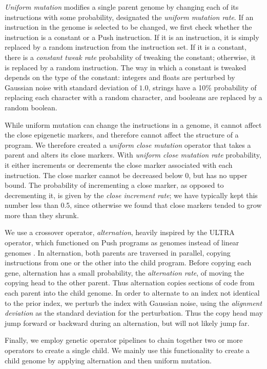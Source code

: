 \documentclass[graybox]{svmult}
\begin{document}
\textit{Uniform mutation} modifies a single parent genome by changing each of its instructions with some probability, designated the \textit{uniform mutation rate}. If an instruction in the genome is selected to be changed, we first check whether the instruction is a constant or a Push instruction. If it is an instruction, it is simply replaced by a random instruction from the instruction set. If it is a constant, there is a \textit{constant tweak rate} probability of tweaking the constant; otherwise, it is replaced by a random instruction. The way in which a constant is tweaked depends on the type of the constant: integers and floats are perturbed by Gaussian noise with standard deviation of $1.0$, strings have a 10\% probability of replacing each character with a random character, and booleans are replaced by a random boolean.

While uniform mutation can change the instructions in a genome, it cannot affect the close epigenetic markers, and therefore cannot affect the structure of a program. We therefore created a \textit{uniform close mutation} operator that takes a parent and alters its close markers. With \textit{uniform close mutation rate} probability, it either increments or decrements the close marker associated with each instruction. The close marker cannot be decreased below 0, but has no upper bound. The probability of incrementing a close marker, as opposed to decrementing it, is given by the \textit{close increment rate}; we have typically kept this number less than 0.5, since otherwise we found that close markers tended to grow more than they shrunk.

We use a crossover operator, \textit{alternation}, heavily inspired by the ULTRA operator, which functioned on Push programs as genomes instead of linear genomes \cite{Spector:2013:GPTP}. In alternation, both parents are traversed in parallel, copying instructions from one or the other into the child program. Before copying each gene, alternation has a small probability, the \textit{alternation rate}, of moving the copying head to the other parent. Thus alternation copies sections of code from each parent into the child genome. In order to alternate to an index not identical to the prior index, we perturb the index with Gaussian noise, using the \textit{alignment deviation} as the standard deviation for the perturbation. Thus the copy head may jump forward or backward during an alternation, but will not likely jump far.

Finally, we employ genetic operator pipelines to chain together two or more operators to create a single child. We mainly use this functionality to create a child genome by applying alternation and then uniform mutation.
\end{document}
